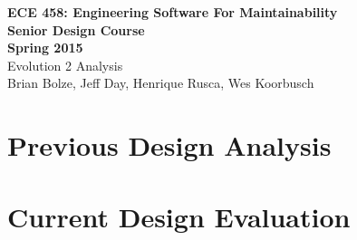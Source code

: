 \documentclass[11pt]{article}
\begin{document}
\begin{center}
\textbf{ECE 458: Engineering Software For Maintainability \\
Senior Design Course\\
Spring 2015\\[0.2in]}
Evolution 2 Analysis\\
Brian Bolze, Jeff Day, Henrique Rusca, Wes Koorbusch
\end{center}

\singlespacing
\tableofcontents





\pagebreak

\section{Previous Design Analysis}

\section{Current Design Evaluation}
\end{document}
